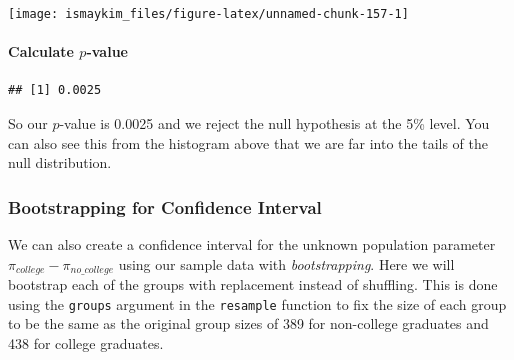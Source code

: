 \documentclass[]{tufte-book}
\newenvironment{Shaded}{\begin{snugshade}}{\end{snugshade}}
\newcommand{\KeywordTok}[1]{\textcolor[rgb]{0.13,0.29,0.53}{\textbf{{#1}}}}
\newcommand{\DataTypeTok}[1]{\textcolor[rgb]{0.13,0.29,0.53}{{#1}}}
\newcommand{\DecValTok}[1]{\textcolor[rgb]{0.00,0.00,0.81}{{#1}}}
\newcommand{\StringTok}[1]{\textcolor[rgb]{0.31,0.60,0.02}{{#1}}}
\newcommand{\OtherTok}[1]{\textcolor[rgb]{0.56,0.35,0.01}{{#1}}}
\newcommand{\NormalTok}[1]{{#1}}
\theoremstyle{definition}
\theoremstyle{definition}
\theoremstyle{remark}
\begin{document}
\begin{center}\texttt{[image: ismaykim\_files/figure-latex/unnamed-chunk-157-1]} \end{center}

\paragraph{\texorpdfstring{Calculate
\(p\)-value}{Calculate p-value}}\label{calculate-p-value-2}

\begin{Shaded}
\end{Shaded}

\begin{verbatim}
## [1] 0.0025
\end{verbatim}

So our \(p\)-value is 0.0025 and we reject the null hypothesis at the
5\% level. You can also see this from the histogram above that we are
far into the tails of the null distribution.

\subsubsection{Bootstrapping for Confidence
Interval}\label{bootstrapping-for-confidence-interval-2}

We can also create a confidence interval for the unknown population
parameter \(\pi_{college} - \pi_{no\_college}\) using our sample data
with \emph{bootstrapping}. Here we will bootstrap each of the groups
with replacement instead of shuffling. This is done using the
\texttt{groups} argument in the \texttt{resample} function to fix the
size of each group to be the same as the original group sizes of 389 for
non-college graduates and 438 for college graduates.

\begin{Shaded}
\end{Shaded}
\end{document}
